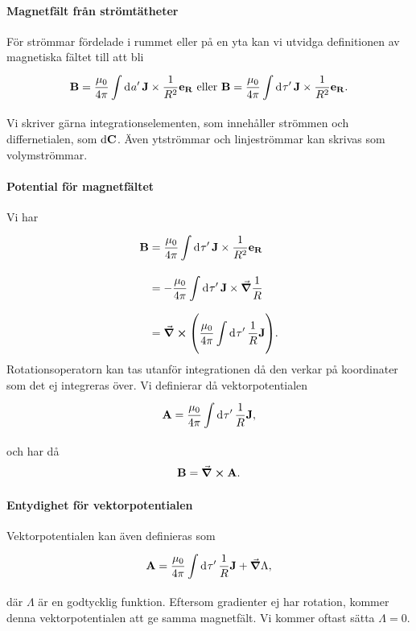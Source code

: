 \paragraph{Magnetfält från strömtätheter}
För strömmar fördelade i rummet eller på en yta kan vi utvidga definitionen av magnetiska fältet till att bli
\begin{align*}
	\vb{B} = \frac{\mu_{0}}{4\pi}\integ{}{}{a'}{\vb{J}\times\frac{1}{R^{2}}\ub{R}}\ \text{eller}\ \vb{B} = \frac{\mu_{0}}{4\pi}\integ{}{}{\tau'}{\vb{J}\times\frac{1}{R^{2}}\ub{R}}.
\end{align*}
Vi skriver gärna integrationselementen, som innehåller strömmen och differnetialen, som $\dd{\vb{C}}$. Även ytströmmar och linjeströmmar kan skrivas som volymströmmar.

\paragraph{Potential för magnetfältet}
Vi har
\begin{align*}
	\vb{B} &= \frac{\mu_{0}}{4\pi}\int\limits_{}^{}\dd[]{\tau'}\vb{J}\times\frac{1}{R^{2}}\vb{e}_{\vb{R}} \\
	       &= -\frac{\mu_{0}}{4\pi}\int\limits_{}^{}\dd[]{\tau'}\vb{J}\times\grad{\frac{1}{R}} \\
	       &= \curl(\frac{\mu_{0}}{4\pi}\int\limits_{}^{}\dd[]{\tau'}\frac{1}{R}\vb{J}).
\end{align*}
Rotationsoperatorn kan tas utanför integrationen då den verkar på koordinater som det ej integreras över. Vi definierar då vektorpotentialen
\begin{align*}
	\vb{A} = \frac{\mu_{0}}{4\pi}\int\limits_{}^{}\dd[]{\tau'}\frac{1}{R}\vb{J},
\end{align*}
och har då
\begin{align*}
	\vb{B} = \curl{\vb{A}}.
\end{align*}

\paragraph{Entydighet för vektorpotentialen}
Vektorpotentialen kan även definieras som
\begin{align*}
	\vb{A} = \frac{\mu_{0}}{4\pi}\int\limits_{}^{}\dd[]{\tau'}\frac{1}{R}\vb{J} + \grad{\Lambda},
\end{align*}
där $\Lambda$ är en godtycklig funktion. Eftersom gradienter ej har rotation, kommer denna vektorpotentialen att ge samma magnetfält. Vi kommer oftast sätta $\Lambda = 0$.

